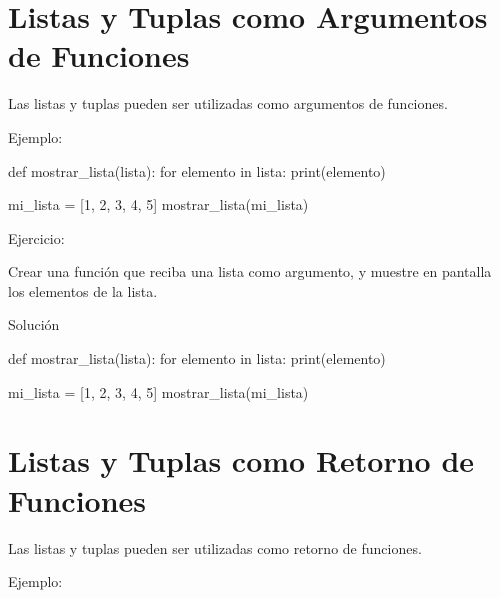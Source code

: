 \documentclass[
  a4paper,
  DIV=11,
  numbers=noendperiod,
  onepage,
  openany]{scrreprt}
\newenvironment{Shaded}{\begin{snugshade}}{\end{snugshade}}
\newcommand{\BuiltInTok}[1]{\textcolor[rgb]{0.00,0.23,0.31}{#1}}
\newcommand{\ControlFlowTok}[1]{\textcolor[rgb]{0.00,0.23,0.31}{#1}}
\newcommand{\DecValTok}[1]{\textcolor[rgb]{0.68,0.00,0.00}{#1}}
\newcommand{\KeywordTok}[1]{\textcolor[rgb]{0.00,0.23,0.31}{#1}}
\newcommand{\NormalTok}[1]{\textcolor[rgb]{0.00,0.23,0.31}{#1}}
\newcommand{\OperatorTok}[1]{\textcolor[rgb]{0.37,0.37,0.37}{#1}}
\begin{document}
\chapter{Listas y Tuplas como Argumentos de
Funciones}\label{listas-y-tuplas-como-argumentos-de-funciones}

Las listas y tuplas pueden ser utilizadas como argumentos de funciones.

Ejemplo:

\begin{Shaded}
\begin{Highlighting}[]
\KeywordTok{def}\NormalTok{ mostrar\_lista(lista):}
    \ControlFlowTok{for}\NormalTok{ elemento }\KeywordTok{in}\NormalTok{ lista:}
        \BuiltInTok{print}\NormalTok{(elemento)}

\NormalTok{mi\_lista }\OperatorTok{=}\NormalTok{ [}\DecValTok{1}\NormalTok{, }\DecValTok{2}\NormalTok{, }\DecValTok{3}\NormalTok{, }\DecValTok{4}\NormalTok{, }\DecValTok{5}\NormalTok{]}
\NormalTok{mostrar\_lista(mi\_lista)}
\end{Highlighting}
\end{Shaded}

Ejercicio:

Crear una función que reciba una lista como argumento, y muestre en
pantalla los elementos de la lista.

Solución

\begin{Shaded}
\begin{Highlighting}[]
  \KeywordTok{def}\NormalTok{ mostrar\_lista(lista):}
      \ControlFlowTok{for}\NormalTok{ elemento }\KeywordTok{in}\NormalTok{ lista:}
          \BuiltInTok{print}\NormalTok{(elemento)}

\NormalTok{  mi\_lista }\OperatorTok{=}\NormalTok{ [}\DecValTok{1}\NormalTok{, }\DecValTok{2}\NormalTok{, }\DecValTok{3}\NormalTok{, }\DecValTok{4}\NormalTok{, }\DecValTok{5}\NormalTok{]}
\NormalTok{  mostrar\_lista(mi\_lista)}
\end{Highlighting}
\end{Shaded}

\chapter{Listas y Tuplas como Retorno de
Funciones}\label{listas-y-tuplas-como-retorno-de-funciones}

Las listas y tuplas pueden ser utilizadas como retorno de funciones.

Ejemplo:
\end{document}

